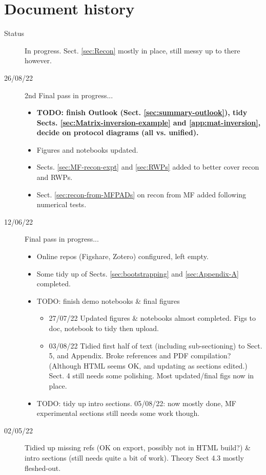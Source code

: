 \section*{Document history}

\begin{description}
\item [{Status}] In progress. Sect. \ref{sec:Recon} mostly in place, still messy up to there however.
\item [{26/08/22}] 2nd Final pass in progress...
\begin{itemize}
\item \textbf{TODO: finish Outlook (Sect. \ref{sec:summary-outlook}), tidy Sects. \ref{sec:Matrix-inversion-example} and \ref{app:mat-inversion}, decide on protocol diagrams (all vs. unified).}
\item Figures and notebooks updated.
\item Sects. \ref{sec:MF-recon-expt} and \ref{sec:RWPs} added to better cover recon and RWPs.
\item Sect. \ref{sec:recon-from-MFPADs} on recon from MF added following numerical tests.
\end{itemize}
\item [{12/06/22}] Final pass in progress...
\begin{itemize}
\item Online repos (Figshare, Zotero) configured, left empty.
\item Some tidy up of Sects. \ref{sec:bootstrapping} and \ref{sec:Appendix-A} completed.
\item TODO: finish demo notebooks \& final figures
\begin{itemize}
\item 27/07/22 Updated figures \& notebooks almost completed. Figs to doc, notebook to tidy then upload.
\item 03/08/22 Tidied first half of text (including sub-sectioning) to Sect. 5, and Appendix. Broke references and PDF compilation? (Although HTML seems OK, and updating as sections edited.) Sect. 4 still needs some polishing. Most updated/final figs now in place.
\end{itemize}
\item TODO: tidy up intro sections. 05/08/22: now mostly done, MF experimental sections still needs some work though.
\end{itemize}
\item [{02/05/22}] Tidied up missing refs (OK on export, possibly not in HTML build?) \& intro sections (still needs quite a bit of work). Theory Sect 4.3 mostly fleshed-out.

\end{description}
